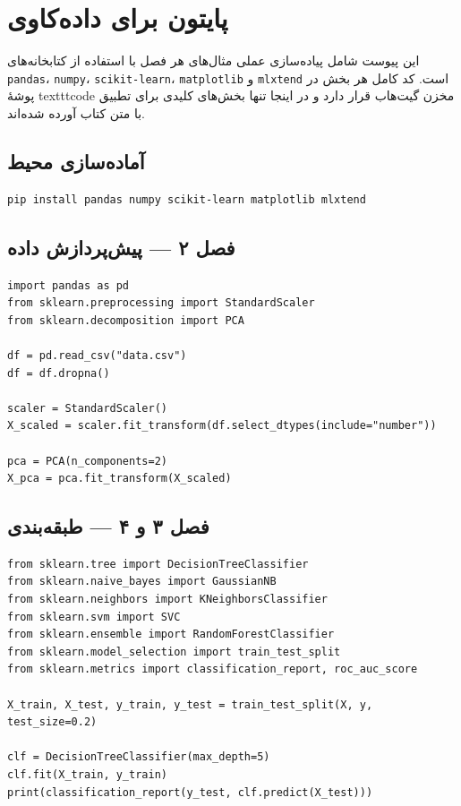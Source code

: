 \chapter{پایتون برای داده‌کاوی}
\label{app:python}

این پیوست شامل پیاده‌سازی عملی مثال‌های هر فصل با استفاده از کتابخانه‌های \texttt{pandas}،
\texttt{numpy}، \texttt{scikit-learn}، \texttt{matplotlib} و \texttt{mlxtend} است.
کد کامل هر بخش در پوشهٔ texttt{code} مخزن گیت‌هاب قرار دارد و در اینجا تنها بخش‌های
کلیدی برای تطبیق با متن کتاب آورده شده‌اند.

\section{آماده‌سازی محیط}
\begin{lstlisting}
pip install pandas numpy scikit-learn matplotlib mlxtend
\end{lstlisting}

\section{فصل ۲ — پیش‌پردازش داده}
\begin{lstlisting}
import pandas as pd
from sklearn.preprocessing import StandardScaler
from sklearn.decomposition import PCA

df = pd.read_csv("data.csv")
df = df.dropna()

scaler = StandardScaler()
X_scaled = scaler.fit_transform(df.select_dtypes(include="number"))

pca = PCA(n_components=2)
X_pca = pca.fit_transform(X_scaled)
\end{lstlisting}

\section{فصل ۳ و ۴ — طبقه‌بندی}
\begin{lstlisting}
from sklearn.tree import DecisionTreeClassifier
from sklearn.naive_bayes import GaussianNB
from sklearn.neighbors import KNeighborsClassifier
from sklearn.svm import SVC
from sklearn.ensemble import RandomForestClassifier
from sklearn.model_selection import train_test_split
from sklearn.metrics import classification_report, roc_auc_score

X_train, X_test, y_train, y_test = train_test_split(X, y, test_size=0.2)

clf = DecisionTreeClassifier(max_depth=5)
clf.fit(X_train, y_train)
print(classification_report(y_test, clf.predict(X_test)))
\end{lstlisting}

